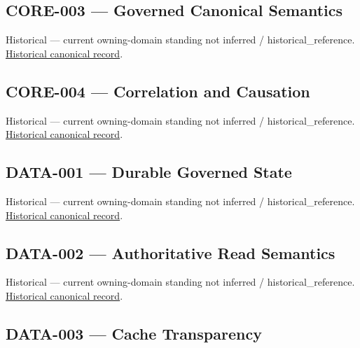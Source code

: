 \subsection{CORE-003 — Governed Canonical Semantics}

\par\label{element:006383a5cce64780960fda32b6682d8d}
Historical — current owning-domain standing not inferred / historical\_reference. \href{../../../../continuum/motivation/requirement/006383a5cce64780960fda32b6682d8d.md}{Historical canonical record}.\par

\subsection{CORE-004 — Correlation and Causation}

\par\label{element:f2e504e7d6374e41a81303265adda6de}
Historical — current owning-domain standing not inferred / historical\_reference. \href{../../../../continuum/motivation/requirement/f2e504e7d6374e41a81303265adda6de.md}{Historical canonical record}.\par

\subsection{DATA-001 — Durable Governed State}

\par\label{element:15c71ccd5d714503891aece2a23445e1}
Historical — current owning-domain standing not inferred / historical\_reference. \href{../../../../continuum/motivation/requirement/15c71ccd5d714503891aece2a23445e1.md}{Historical canonical record}.\par

\subsection{DATA-002 — Authoritative Read Semantics}

\par\label{element:bc55838493c24617823410798c8d7598}
Historical — current owning-domain standing not inferred / historical\_reference. \href{../../../../continuum/motivation/requirement/bc55838493c24617823410798c8d7598.md}{Historical canonical record}.\par

\subsection{DATA-003 — Cache Transparency}

